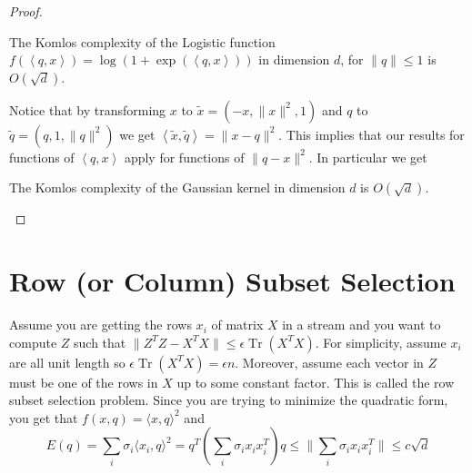 \documentclass[anon,12pt]{colt2019} %
\newcommand{\ip}[1]{\left \langle #1 \right \rangle}
\newcommand{\eps}{\epsilon}
\begin{document}
\begin{proof}
\begin{corollary}
The Komlos complexity of the Logistic function $f(\ip{q,x}) = \log(1+\exp(\ip{q,x}))$ in dimension $d$, for $\|q\| \leq 1$ is $O(\sqrt{d})$.
\end{corollary}

Notice that by transforming $x$ to $\tilde{x} = (-x, \|x\|^2, 1)$ and $q$ to $\tilde{q} = (q, 1, \|q\|^2)$ we get $\ip{\tilde{x},\tilde{q}} = \|x-q\|^2$. This implies that our results for functions of $\ip{q,x}$ apply for functions of $\|q-x\|^2$. In particular we get
\begin{corollary}
The Komlos complexity of the Gaussian kernel in dimension $d$ is $O(\sqrt{d})$.
\end{corollary}








\end{proof}





\section{Row (or Column) Subset Selection}
Assume you are getting the rows $x_i$  of matrix $X$ in a stream and you want to compute $Z$ such that $\|Z^TZ - X^TX\| \le \eps \operatorname{Tr}(X^TX)$.
For simplicity, assume $x_i$ are all unit length so $\eps \operatorname{Tr}(X^TX) = \eps n$. Moreover, assume each vector in $Z$ must be one of the rows in $X$ up to some constant factor.
This is called the row subset selection problem. 
Since you are trying to minimize the quadratic form, you get that $f(x, q) = \langle x,q \rangle ^2$ and 
$$E(q) = \sum_i \sigma_i \langle x_i,q \rangle ^2 = q^T (\sum_i \sigma_i x_i x_i^T ) q \le \|\sum_i \sigma_i x_i x_i^T\| \le c\sqrt{d}$$
\end{document}
